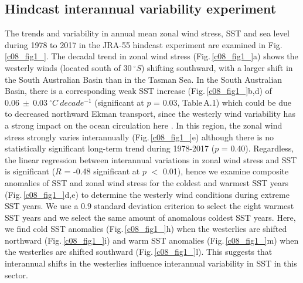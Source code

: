\documentclass[draft,linenumbers]{agujournal2018}
\begin{document}
\subsection{Hindcast interannual variability experiment}
The trends and variability in annual mean zonal wind stress, SST and sea level during 1978 to 2017 in the JRA-55 hindcast experiment are examined in Fig.\,\ref{c08_fig1_}. The decadal trend in zonal wind stress (Fig.\,\ref{c08_fig1_}a) shows the westerly winds (located south of $30\ ^{\circ}S$) shifting southward, with a larger shift in the South Australian Basin than in the Tasman Sea. In the South Australian Basin, there is a corresponding weak SST increase (Fig.\,\ref{c08_fig1_}b,d) of $0.06\ \pm\ 0.03\ ^{\circ}C\ decade^{-1}$ (significant at $p$ = 0.03, Table\,A.1) which could be due to decreased northward Ekman transport, since the westerly wind variability has a strong impact on the ocean circulation here \citep{Middleton2007}. In this region, the zonal wind stress strongly varies interannually (Fig.\,\ref{c08_fig1_}e) although there is no statistically significant long-term trend during 1978-2017 ($p$ = 0.40). Regardless, the linear regression between interannual variations in zonal wind stress and SST is significant ($R$ = -0.48 significant at $p$ $<$ 0.01), hence we examine composite anomalies of SST and zonal wind stress for the coldest and warmest SST years (Fig.\,\ref{c08_fig1_}d,e) to determine the westerly wind conditions during extreme SST years. We use a 0.9 standard deviation criterion to select the eight warmest SST years and we select the same amount of anomalous coldest SST years. Here, we find cold SST anomalies (Fig.\,\ref{c08_fig1_}h) when the westerlies are shifted northward (Fig.\,\ref{c08_fig1_}i) and warm SST anomalies (Fig.\,\ref{c08_fig1_}m) when the westerlies are shifted southward (Fig.\,\ref{c08_fig1_}l). This suggests that interannual shifts in the westerlies influence interannual variability in SST in this sector.
\end{document}
